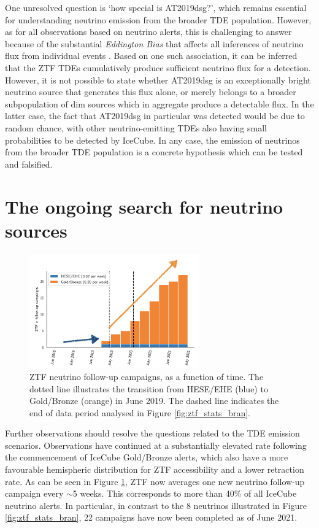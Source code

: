 \documentclass[a4paper,11pt]{article}
\begin{document}
One unresolved question is `how special is AT2019dsg?', which remains essential for understanding neutrino emission from the broader TDE population. However, as for all observations based on neutrino alerts, this is challenging to answer because of the substantial \emph{Eddington Bias} that affects all inferences of neutrino flux from individual events \cite{nora_eddington_19}. Based on one such association, it can be inferred that the ZTF TDEs cumulatively produce sufficient neutrino flux for a detection. However, it is not possible to state whether AT2019dsg is an exceptionally bright neutrino source that generates this flux alone, or merely belongs to a broader subpopulation of dim sources which in aggregate produce a detectable flux. In the latter case, the fact that AT2019dsg in particular was detected would be due to random chance, with other neutrino-emitting TDEs also having small probabilities to be detected by IceCube. In any case, the emission of neutrinos from the broader TDE population is a concrete hypothesis which can be tested and falsified.

\section{The ongoing search for neutrino sources}

\begin{figure}[!ht]
	\centering
	\includegraphics[width=0.65\textwidth]{figures/ztf_nu_rate}
	\caption{ZTF neutrino follow-up campaigns, as a function of time. The dotted line illustrates the transition from HESE/EHE (blue) to Gold/Bronze (orange) in June 2019. The dashed line indicates the end of data period analysed in Figure \ref{fig:ztf_stats_bran}.}
	\label{fig:ztf_nu_rate}
\end{figure}

Further observations should resolve the questions related to the TDE emission scenarios. Observations have continued at a substantially elevated rate following the commencement of IceCube Gold/Bronze alerts, which also have a more favourable hemispheric distribution for ZTF accessibility and a lower retraction rate. As can be seen in Figure \ref{fig:ztf_nu_rate}, ZTF now averages one new neutrino follow-up campaign every $\sim$5 weeks. This corresponds to more than 40\% of all IceCube neutrino alerts. In particular, in contrast to the 8 neutrinos illustrated in Figure \ref{fig:ztf_stats_bran}, 22 campaigns have now been completed as of June 2021.
\end{document}
